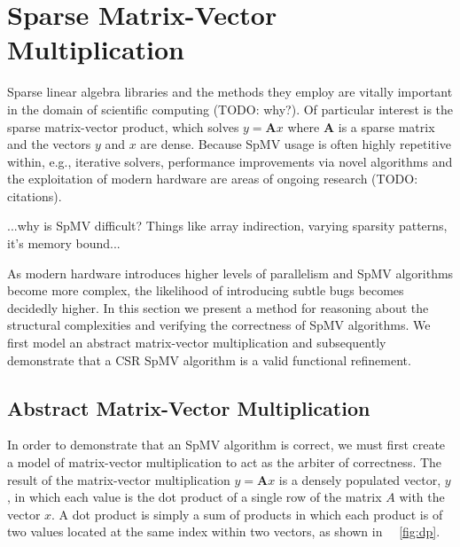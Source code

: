 \section{Sparse Matrix-Vector Multiplication}
\label{sec:spmv}

Sparse linear algebra libraries and the methods they employ are vitally important in the domain of scientific computing (TODO: why?).  Of particular interest is the sparse matrix-vector product, which solves $y = \bm{A}x$ where $\bm{A}$ is a sparse matrix and the vectors $y$ and $x$ are dense.  Because SpMV usage is often highly repetitive within, e.g., iterative solvers, performance improvements via novel algorithms and the exploitation of modern hardware are areas of ongoing research (TODO: citations).

...why is SpMV difficult? Things like array indirection, varying sparsity patterns, it's memory bound...

As modern hardware introduces higher levels of parallelism and SpMV algorithms become more complex, the likelihood of introducing subtle bugs becomes decidedly higher.  In this section we present a method for reasoning about the structural complexities and verifying the correctness of SpMV algorithms.  We first model an abstract matrix-vector multiplication and subsequently demonstrate that a CSR SpMV algorithm is a valid functional refinement.

\subsection{Abstract Matrix-Vector Multiplication}
\label{sec:mvmabs}

In order to demonstrate that an SpMV algorithm is correct, we must first create a model of matrix-vector multiplication to act as the arbiter of correctness.  The result of the matrix-vector multiplication $y = \bm{A}x$ is a densely populated vector, $y$, in which each value is the dot product of a single row of the matrix $A$ with the vector $x$.  A dot product is simply a sum of products in which each product is of two values located at the same index within two vectors, as shown in ~\figurename~\ref{fig:dp}.

